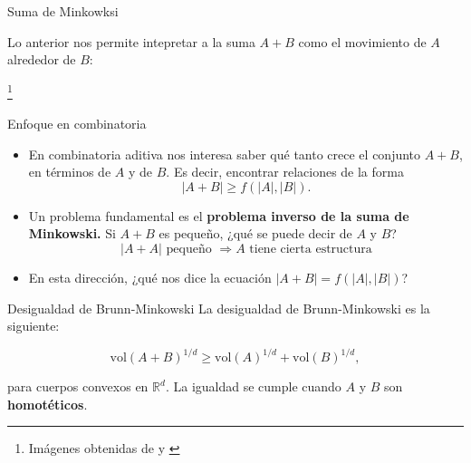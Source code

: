 \documentclass{beamer}
\newcommand\blfootnote[1]{%
  \begingroup
  \renewcommand\thefootnote{}\footnote{#1}%
  \addtocounter{footnote}{-1}%
  \endgroup
}
\newcommand{\vol}{\mathrm{vol}}
\begin{document}




\begin{frame}{Suma de Minkowksi}

Lo anterior nos permite intepretar a la suma $A+B$ como el movimiento de $A$ alrededor de $B:$ 
    
    
    
\blfootnote{Imágenes obtenidas de \cite{book} y \cite{Gardner2002TheBI}}
\end{frame}

\begin{frame}{Enfoque en combinatoria}
\begin{itemize}[<+->]
    \item En combinatoria aditiva nos interesa saber qué tanto crece el conjunto $A+B$, en términos de $A$ y de $B$. Es decir, encontrar relaciones de la forma $$\lvert A + B \lvert \geq f(\lvert A \rvert, \lvert B \rvert).$$
    \item Un problema fundamental es el \textbf{problema inverso de la suma de Minkowski.} Si $A + B$ es pequeño, ¿qué se puede decir de $A$ y $B$?
    $$\lvert A + A \rvert \text{ pequeño } \Rightarrow  A \text{ tiene cierta estructura}$$
    \item En esta dirección, ¿qué nos dice la ecuación $\lvert A + B \lvert = f(\lvert A \rvert, \lvert B \rvert)$?
\end{itemize}

\end{frame}


\begin{frame}{Desigualdad de Brunn-Minkowski}
    La desigualdad de Brunn-Minkowski es la siguiente:

    $$\vol(A+B)^{1/d} \geq \vol(A)^{1/d} + \vol(B)^{1/d},$$

    para cuerpos convexos en $\mathbb R^d.$ La igualdad se cumple cuando $A$ y $B$ son \textbf{homotéticos}. 
\end{frame}
\end{document}
